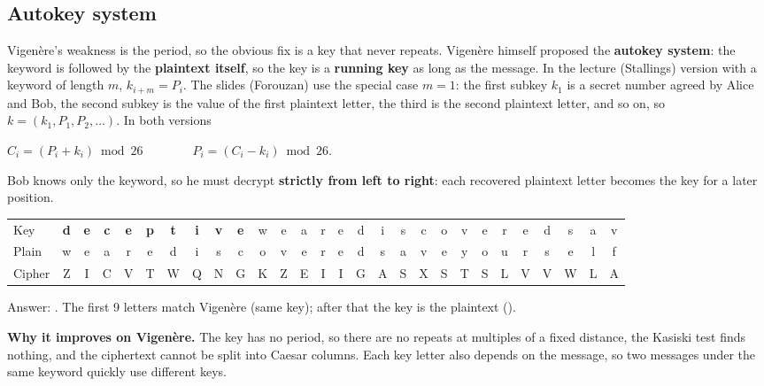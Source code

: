 \subsection{Autokey system \hot}
Vigen\`ere's weakness is the period, so the obvious fix is a key that never repeats. Vigen\`ere himself proposed the \textbf{autokey system}: the keyword is followed by the \textbf{plaintext itself}, so the key is a \textbf{running key} as long as the message. In the lecture (Stallings) version with a keyword of length $m$, $k_{i+m} = P_i$. The slides (Forouzan) use the special case $m = 1$: the first subkey $k_1$ is a secret number agreed by Alice and Bob, the second subkey is the value of the first plaintext letter, the third is the second plaintext letter, and so on, so $k = (k_1, P_1, P_2, \dots)$. In both versions
\begin{center}
$C_i = (P_i + k_i) \bmod 26 \qquad\qquad P_i = (C_i - k_i) \bmod 26 .$
\end{center}
Bob knows only the keyword, so he must decrypt \textbf{strictly from left to right}: each recovered plaintext letter becomes the key for a later position.
\begin{center}\small\ttfamily\setlength{\tabcolsep}{2.2pt}
\begin{tabular}{@{}l*{27}{c}@{}}
\rmfamily Key & \textbf{d}&\textbf{e}&\textbf{c}&\textbf{e}&\textbf{p}&\textbf{t}&\textbf{i}&\textbf{v}&\textbf{e}&w&e&a&r&e&d&i&s&c&o&v&e&r&e&d&s&a&v\\
\rmfamily Plain & w&e&a&r&e&d&i&s&c&o&v&e&r&e&d&s&a&v&e&y&o&u&r&s&e&l&f\\
\rmfamily Cipher & Z&I&C&V&T&W&Q&N&G&K&Z&E&I&I&G&A&S&X&S&T&S&L&V&V&W&L&A
\end{tabular}
\end{center}
Answer: \textbf{}. The first 9 letters match Vigen\`ere (same key); after that the key is the plaintext ().

\textbf{Why it improves on Vigen\`ere.} The key has no period, so there are no repeats at multiples of a fixed distance, the Kasiski test finds nothing, and the ciphertext cannot be split into Caesar columns. Each key letter also depends on the message, so two messages under the same keyword quickly use different keys.

